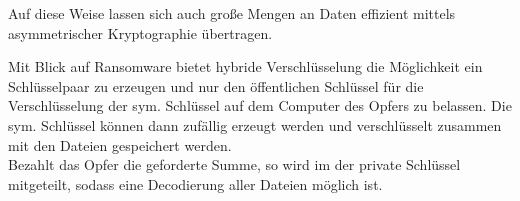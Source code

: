 Auf diese Weise lassen sich auch große Mengen an Daten effizient mittels asymmetrischer Kryptographie übertragen.

Mit Blick auf Ransomware bietet hybride Verschlüsselung die Möglichkeit ein Schlüsselpaar zu erzeugen und nur den öffentlichen Schlüssel für die Verschlüsselung der sym. Schlüssel auf dem Computer des Opfers zu belassen. Die sym. Schlüssel können dann zufällig erzeugt werden und verschlüsselt zusammen mit den Dateien gespeichert werden. \\ Bezahlt das Opfer die geforderte Summe, so wird im der private Schlüssel mitgeteilt, sodass eine Decodierung aller Dateien möglich ist.
